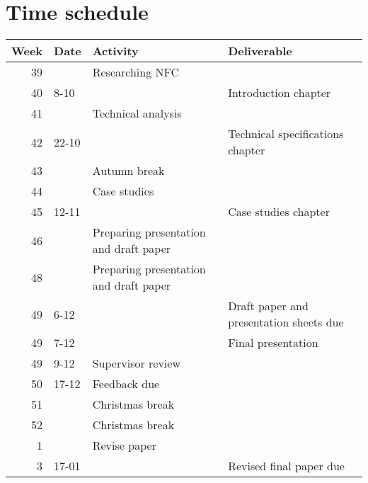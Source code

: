 \documentclass[11pt]{article} %
\begin{document}
\section{Time schedule}
\begin{center}
  \begin{tabular}{ | r | l | l || l | }
    \hline
    Week & Date & Activity & Deliverable \\ \hline
    39 &  & Researching NFC &  \\ \hline
    40 & 8-10 & & Introduction chapter \\ \hline
    41 &  & Technical analysis & \\ \hline
    42 &22-10 & & Technical specifications chapter \\ \hline
    43 & & Autumn break & \\ \hline
    44 & & Case studies & \\ \hline
    45 & 12-11& & Case studies chapter\\ \hline
    46 & & Preparing presentation and draft paper & \\ \hline
    48 & & Preparing presentation and draft paper & \\ \hline
    49 & 6-12 & & Draft paper and presentation sheets due \\ \hline
    49 & 7-12 & & Final presentation  \\ \hline
    49 & 9-12 & Supervisor review & \\ \hline
    50 & 17-12 & Feedback due & \\ \hline
    51 & & Christmas break & \\ \hline
    52 & & Christmas break & \\ \hline
    1 & & Revise paper & \\ \hline
    3 & 17-01 & & Revised final paper due \\ \hline
  \end{tabular}
\end{center}


\end{document}
